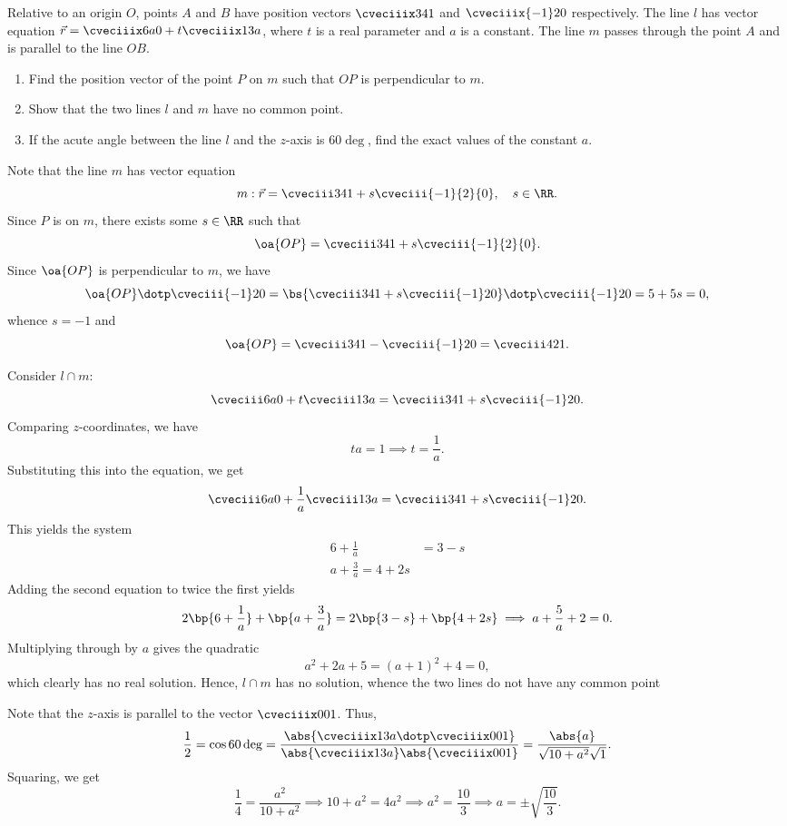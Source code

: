 \begin{problem}
    Relative to an origin $O$, points $A$ and $B$ have position vectors $\cveciiix341$ and $\cveciiix{-1}20$ respectively. The line $l$ has vector equation $\vec r = \cveciiix6a0 + t\cveciiix13a$, where $t$ is a real parameter and $a$ is a constant. The line $m$ passes through the point $A$ and is parallel to the line $OB$.

    \begin{enumerate}
        \item Find the position vector of the point $P$ on $m$ such that $OP$ is perpendicular to $m$.
        \item Show that the two lines $l$ and $m$ have no common point.
        \item If the acute angle between the line $l$ and the $z$-axis is $60\deg$, find the exact values of the constant $a$.
    \end{enumerate}
\end{problem}
\begin{solution}
    \begin{ppart}
        Note that the line $m$ has vector equation \[m : \vec r = \cveciii341 + s \cveciii{-1}{2}{0}, \quad s \in \RR.\] Since $P$ is on $m$, there exists some $s \in \RR$ such that \[\oa{OP} = \cveciii341 + s \cveciii{-1}{2}{0}.\] Since $\oa{OP}$ is perpendicular to $m$, we have \[\oa{OP} \dotp \cveciii{-1}20 = \bs{\cveciii341 + s\cveciii{-1}20} \dotp \cveciii{-1}20 = 5 + 5s = 0,\] whence $s = -1$ and \[\oa{OP} = \cveciii341 - \cveciii{-1}20 = \cveciii421.\]
    \end{ppart}
    \begin{ppart}
        Consider $l \cap m$: \[\cveciii6a0 + t\cveciii13a = \cveciii341 + s\cveciii{-1}20.\] Comparing $z$-coordinates, we have \[ta = 1 \implies t = \frac1a.\] Substituting this into the equation, we get \[\cveciii6a0 + \frac1a \cveciii13a = \cveciii341 + s\cveciii{-1}20.\] This yields the system \begin{align*}
            6 + \frac1a &= 3 - s\\
            a + \frac3a = 4 + 2s
        \end{align*}
        Adding the second equation to twice the first yields \[2\bp{6 + \frac1a} + \bp{a + \frac3a} = 2\bp{3 - s} + \bp{4 + 2s} \implies a + \frac5a + 2 = 0.\] Multiplying through by $a$ gives the quadratic \[a^2 + 2a + 5 = (a + 1)^2 + 4 = 0,\] which clearly has no real solution. Hence, $l \cap m$ has no solution, whence the two lines do not have any common point
    \end{ppart}
    \begin{ppart}
        Note that the $z$-axis is parallel to the vector $\cveciiix001$. Thus, \[\frac12 = \cos 60\deg = \frac{\abs{\cveciiix13a \dotp \cveciiix001}}{\abs{\cveciiix13a} \abs{\cveciiix001}} = \frac{\abs{a}}{\sqrt{10 + a^2} \sqrt{1}}.\] Squaring, we get \[\frac14 = \frac{a^2}{10 + a^2} \implies 10 + a^2 = 4a^2 \implies a^2 = \frac{10}{3} \implies a = \pm \sqrt{\frac{10}3}.\]
    \end{ppart}
\end{solution}

